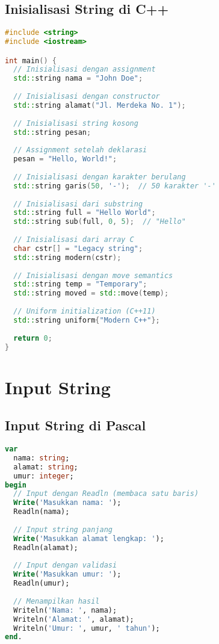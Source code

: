 \documentclass[../main.tex]{subfiles}
\begin{document}
\subsection{Inisialisasi String di C++}

\begin{lstlisting}[language=C++, caption={Inisialisasi string di C++}]
#include <string>
#include <iostream>

int main() {
  // Inisialisasi dengan assignment
  std::string nama = "John Doe";
  
  // Inisialisasi dengan constructor
  std::string alamat("Jl. Merdeka No. 1");
  
  // Inisialisasi string kosong
  std::string pesan;
  
  // Assignment setelah deklarasi
  pesan = "Hello, World!";
  
  // Inisialisasi dengan karakter berulang
  std::string garis(50, '-');  // 50 karakter '-'
  
  // Inisialisasi dari substring
  std::string full = "Hello World";
  std::string sub(full, 0, 5);  // "Hello"
  
  // Inisialisasi dari array C
  char cstr[] = "Legacy string";
  std::string modern(cstr);
  
  // Inisialisasi dengan move semantics
  std::string temp = "Temporary";
  std::string moved = std::move(temp);
  
  // Uniform initialization (C++11)
  std::string uniform{"Modern C++"};
  
  return 0;
}
\end{lstlisting}

\section{Input String}

\subsection{Input String di Pascal}

\begin{lstlisting}[language=Pascal, caption={Input string di Pascal}]
var
  nama: string;
  alamat: string;
  umur: integer;
begin
  // Input dengan Readln (membaca satu baris)
  Write('Masukkan nama: ');
  Readln(nama);
  
  // Input string panjang
  Write('Masukkan alamat lengkap: ');
  Readln(alamat);
  
  // Input dengan validasi
  Write('Masukkan umur: ');
  Readln(umur);
  
  // Menampilkan hasil
  Writeln('Nama: ', nama);
  Writeln('Alamat: ', alamat);
  Writeln('Umur: ', umur, ' tahun');
end.
\end{lstlisting}
\end{document}
